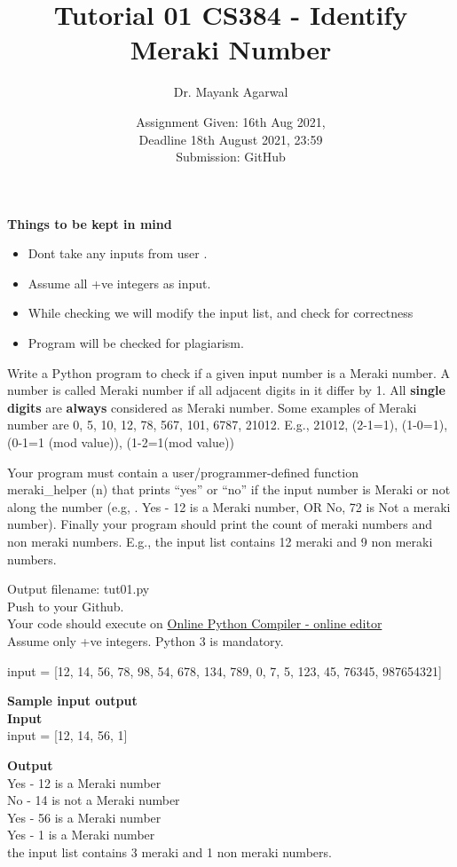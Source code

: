 \documentclass[12pt,  letterpaper,  twoside]{article}
\title{Tutorial 01 CS384 - Identify Meraki Number}
\author{Dr. Mayank Agarwal}
\date{Assignment Given: 16th Aug 2021,\\ Deadline 18th August 2021,  
23:59\\Submission: GitHub }
\begin{document}
	\maketitle  
	\textbf{Things to be kept in mind}\\
	\begin{itemize}
		\item Dont take any inputs from user . 
		\item Assume all +ve integers as input.
		\item While checking we will modify the input list, and check for 
		correctness 
		\item Program will be checked for plagiarism. 
		
	\end{itemize}
	
	Write a Python program to check if a given input number is a Meraki number. A number is called Meraki number if all adjacent digits in it differ by 1. All \textbf{single digits }are \textbf{always }considered as Meraki number. Some examples of Meraki number are 0,  5,  10,  12,  78,  567,  101,  6787,  21012.  E.g.,  21012,  (2-1=1),  (1-0=1),  (0-1=1 (mod value)),  (1-2=1(mod value))
	
	
	 Your program must contain a user/programmer-defined function \\  meraki\_helper (n) that prints “yes” or “no” if the input number is Meraki or not along the number (e.g, . Yes - 12 is a Meraki number,  OR No,  72 is Not a meraki number). Finally your program should print the count of meraki numbers and non meraki numbers. E.g., the input list contains 12 meraki and 9 non meraki numbers.
	  
	 Output filename: tut01.py \\
	 Push to your Github. \\
	 Your code should execute on
	 \href{https://www.onlinegdb.com/online_python_compiler}{Online Python Compiler - online editor} \\
	 Assume only +ve integers. Python 3 is mandatory.
	 
	 input = [12,  14, 56, 78, 98, 54, 678, 134, 789, 0, 7, 5,  123,  45, 76345,  987654321]
	
	
	\textbf{Sample input output }\\
	
	 \textbf{Input}\\
		\noindent	input = [12,  14, 56, 1]
	
	 \textbf{Output}\\
	\noindent	
	Yes - 12 is a Meraki number \\
		No - 14 is not a Meraki number \\
			Yes - 56 is a Meraki number \\
				Yes - 1 is a Meraki number \\
	 the input list contains 3 meraki and 1 non meraki numbers.
\end{document}
